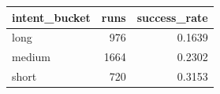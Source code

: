 \begin{tabular}{lrr}
\toprule
intent_bucket & runs & success_rate \\
\midrule
long & 976 & 0.1639 \\
medium & 1664 & 0.2302 \\
short & 720 & 0.3153 \\
\bottomrule
\end{tabular}
